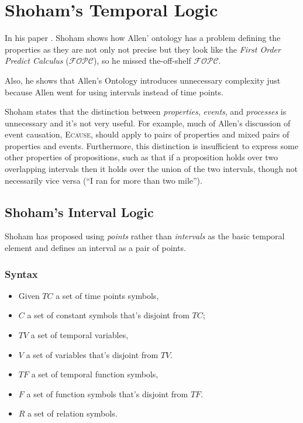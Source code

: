 \section{Shoham's Temporal Logic}

In his paper \cite{shoham1988temporal}.
Shoham shows how Allen' ontology has a problem defining the properties as they are not only not precise but they look like the \textit{First Order Predict Calculus}
($\mathcal{FOPC}$), so he missed the-off-shelf $\mathcal{FOPC}$.

Also, he shows that Allen's Ontology introduces unnecessary complexity just because Allen went for using intervals instead of time points.

Shoham states that the distinction between \textit{properties}, \textit{events}, and \textit{processes} is unnecessary and it's not very useful.
For example, much of Allen's discussion of event causation, \textsc{Ecause}, should apply to pairs of properties and mixed pairs of properties and events. Furthermore, this distinction is insufficient to express some other properties of propositions, such as that if a proposition holds over two overlapping intervals then it holds over
the union of the two intervals, though not necessarily vice versa (``I ran for more than two mile'').


\subsection{Shoham's Interval Logic}
Shoham has proposed using \textit{points} rather than \textit{intervals} as the basic temporal element and defines an interval as a pair of points.
\subsubsection{Syntax}
\begin{itemize}
	\item Given $TC$ a set of time points symbols,
	\item $C$ a set of constant symbols that's disjoint from $TC$;
	\item $TV$ a set of temporal variables,
	\item $V$ a set of variables that's disjoint from $TV$.
	\item $TF$ a set of temporal function symbols,
	\item $F$ a set of function symbols that's disjoint from $TF$.
	\item $R$ a set of relation symbols.
\end{itemize}

